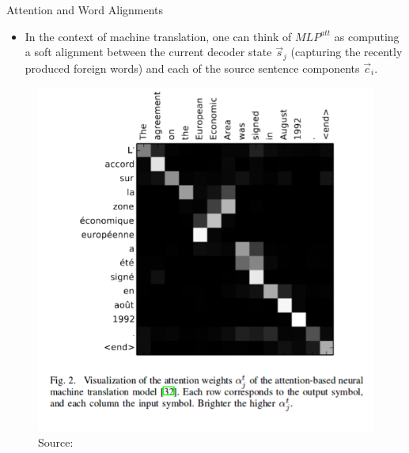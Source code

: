 \documentclass[handout]{beamer}
\begin{document}
\begin{frame}{Attention and Word Alignments}
\begin{scriptsize}
\begin{itemize}
\item In the context of machine translation, one can think of $MLP^{att}$ as computing a soft alignment between the current decoder state $\vec{s}_j$ (capturing the recently produced foreign words) and each of the source sentence components $\vec{c}_i$.


\end{itemize}


         \begin{figure}[h]
        	\includegraphics[scale = 0.28]{pics/attention-alignment.png}
        	\caption{Source: \cite{cho2015describing}}
        \end{figure}  


\end{scriptsize}
\end{frame}
\end{document}
